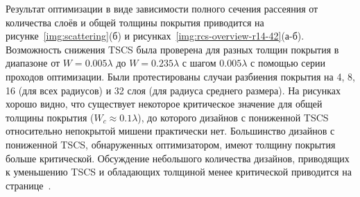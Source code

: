 Результат оптимизации в виде зависимости полного сечения рассеяния от
количества слоёв и общей толщины покрытия приводится на
рисунке~\ref{img:scattering}(б) и
рисунках~\ref{img:rcs-overview-r14-42}(а-б). Возможность снижения TSCS
была проверена для разных толщин покрытия в диапазоне от
${W = 0.005\lambda}$ до ${W = 0.235\lambda}$ с шагом $0.005\lambda$ с
помощью серии проходов оптимизации. Были протестированы случаи
разбиения покрытия на 4, 8, 16 (для всех радиусов) и 32 слоя (для
радиуса среднего размера). На рисунках хорошо видно, что существует
некоторое критическое значение для общей толщины покрытия
(${W_c \approx 0.1\lambda}$), до которого дизайнов с
пониженной TSCS относительно непокрытой мишени практически
нет. Большинство дизайнов с пониженной TSCS, обнаруженных
оптимизатором, имеют толщину покрытия больше критической. Обсуждение
небольшого количества дизайнов, приводящих к уменьшению TSCS и
обладающих толщиной менее критической приводится на
странице~\pageref{ref:thin-designs}.


